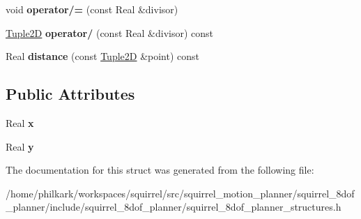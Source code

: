 \begin{DoxyCompactItemize}
\item 
\hypertarget{structSquirrelMotionPlanner_1_1Tuple2D_a39725e585e6a24874845e1f3b2085341}{void {\bfseries operator/=} (const Real \&divisor)}\label{structSquirrelMotionPlanner_1_1Tuple2D_a39725e585e6a24874845e1f3b2085341}

\item 
\hypertarget{structSquirrelMotionPlanner_1_1Tuple2D_a2252aff1eba68c7f6e48e4437557cea0}{\hyperlink{structSquirrelMotionPlanner_1_1Tuple2D}{Tuple2\-D} {\bfseries operator/} (const Real \&divisor) const }\label{structSquirrelMotionPlanner_1_1Tuple2D_a2252aff1eba68c7f6e48e4437557cea0}

\item 
\hypertarget{structSquirrelMotionPlanner_1_1Tuple2D_a901c82328bdab2e6b7abb8a7332455e6}{Real {\bfseries distance} (const \hyperlink{structSquirrelMotionPlanner_1_1Tuple2D}{Tuple2\-D} \&point) const }\label{structSquirrelMotionPlanner_1_1Tuple2D_a901c82328bdab2e6b7abb8a7332455e6}

\end{DoxyCompactItemize}
\subsection*{Public Attributes}
\begin{DoxyCompactItemize}
\item 
\hypertarget{structSquirrelMotionPlanner_1_1Tuple2D_adf1f59d51cbe0e48707eecb0e2ea2f7f}{Real {\bfseries x}}\label{structSquirrelMotionPlanner_1_1Tuple2D_adf1f59d51cbe0e48707eecb0e2ea2f7f}

\item 
\hypertarget{structSquirrelMotionPlanner_1_1Tuple2D_ac894b399fcb5e5d9261a74c93f6d9e3c}{Real {\bfseries y}}\label{structSquirrelMotionPlanner_1_1Tuple2D_ac894b399fcb5e5d9261a74c93f6d9e3c}

\end{DoxyCompactItemize}


The documentation for this struct was generated from the following file\-:\begin{DoxyCompactItemize}
\item 
/home/philkark/workspaces/squirrel/src/squirrel\-\_\-motion\-\_\-planner/squirrel\-\_\-8dof\-\_\-planner/include/squirrel\-\_\-8dof\-\_\-planner/squirrel\-\_\-8dof\-\_\-planner\-\_\-structures.\-h\end{DoxyCompactItemize}
